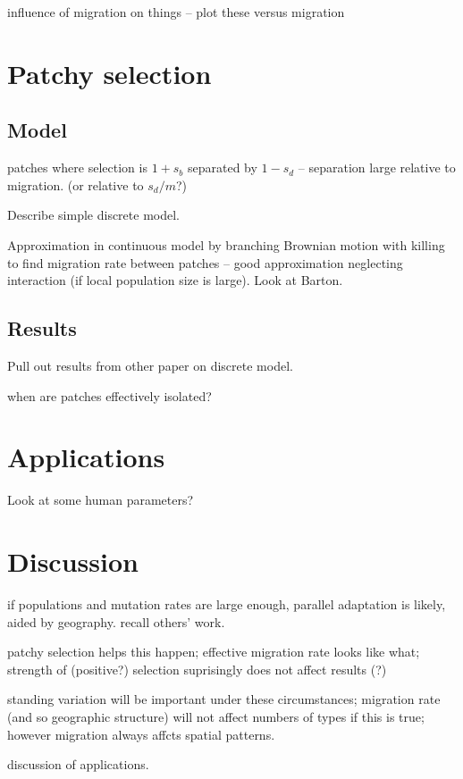 \documentclass{article}
\begin{document}
influence of migration on things -- plot these versus migration 
 
 
\section{Patchy selection} 
 
\subsection{Model} 
 
patches where selection is $1+s_b$ separated by $1-s_d$ -- separation large relative to migration.   
(or relative to $s_d/m$?) 
 
Describe simple discrete model. 
 
Approximation in continuous model by branching Brownian motion with killing to find migration rate between patches -- 
good approximation neglecting interaction (if local population size is large). 
Look at Barton. 
 
\subsection{Results} 
 
Pull out results from other paper on discrete model. 
 
when are patches effectively isolated? 
 
\section{Applications} 
 
Look at some human parameters? 
 
\section{Discussion} 
 
if populations and mutation rates are large enough, parallel adaptation is likely, aided by geography. 
recall others' work. 
 
patchy selection helps this happen; 
effective migration rate looks like what; 
strength of (positive?) selection suprisingly does not affect results (?) 
 
standing variation will be important under these circumstances; 
migration rate (and so geographic structure) will not affect numbers of types if this is true; 
however migration always affcts spatial patterns. 
 
discussion of applications. 
 
\end{document}
